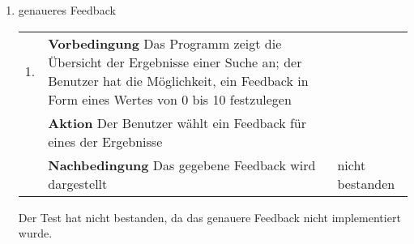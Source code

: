 \begin{enumerate} [label=\bfseries /TSW \arabic*0/, leftmargin=*]
	\item genaueres Feedback \newline \newline
	\begin{tabular}{@{}rp{4in}|l}
	1. & \textbf{Vorbedingung} Das Programm zeigt die Übersicht der Ergebnisse einer Suche an; der Benutzer hat die Möglichkeit, ein Feedback in Form eines Wertes von 0 bis 10 festzulegen & \\
	   & \textbf{Aktion} Der Benutzer wählt ein Feedback für eines der Ergebnisse & \\
	   & \textbf{Nachbedingung} Das gegebene Feedback wird dargestellt & nicht bestanden \\
	\end{tabular}
	\par
Der Test hat nicht bestanden, da das genauere Feedback nicht implementiert wurde.
\end{enumerate}
